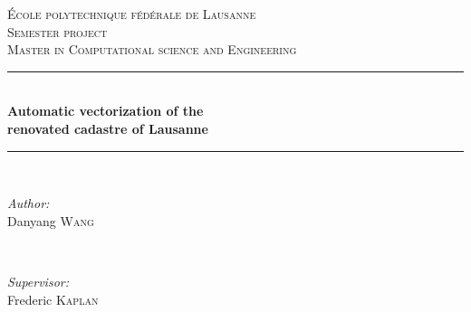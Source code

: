 \begin{titlepage}
\newcommand{\HRule}{\rule{\linewidth}{0.5mm}} %

\center %
 

\vspace{3cm}
\textsc{\LARGE École polytechnique fédérale de Lausanne}\\[1.5cm] %
\textsc{\Large Semester project}\\[0.5cm] %
\textsc{\large Master in Computational science and Engineering}\\[0.5cm] %


\HRule \\[0.4cm] %
{ \huge \bfseries Automatic vectorization of the  \\ renovated cadastre of Lausanne}\\[0.4cm] %
\HRule \\[1.5cm]
 

\begin{minipage}{0.4\textwidth}
\begin{flushleft} \large
\emph{Author:}\\
Danyang \textsc{Wang} %
\end{flushleft}
\end{minipage}
~
\begin{minipage}{0.4\textwidth}
\begin{flushright} \large
\emph{Supervisor:} \\
Frederic \textsc{Kaplan} %
\end{flushright}
\end{minipage}\\[10cm]


\end{titlepage}
